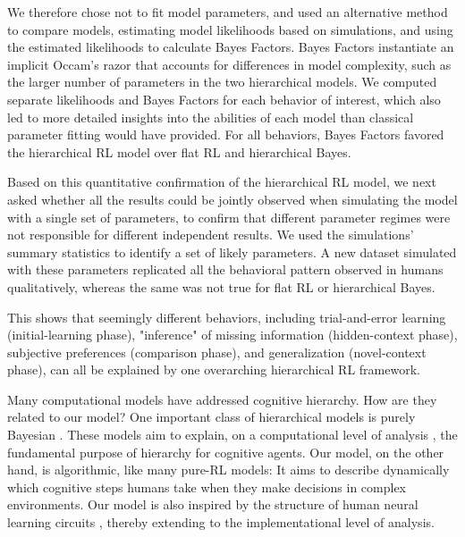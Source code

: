 \documentclass[10pt,letterpaper]{article}  %
\begin{document}
We therefore chose not to fit model parameters, and used an alternative method to compare models, estimating model likelihoods based on simulations, and using the estimated likelihoods to calculate Bayes Factors.
Bayes Factors instantiate an implicit Occam's razor that accounts for differences in model complexity, such as the larger number of parameters in the two hierarchical models. 
We computed separate likelihoods and Bayes Factors for each behavior of interest, which also led to more detailed insights into the abilities of each model than classical parameter fitting would have provided. For all behaviors, Bayes Factors favored the hierarchical RL model over flat RL and hierarchical Bayes.

Based on this quantitative confirmation of the hierarchical RL model, we next asked whether all the results could be jointly observed when simulating the model with a single set of parameters, to confirm that different parameter regimes were not responsible for different independent results. We used the simulations' summary statistics to identify a set of likely parameters.
A new dataset simulated with these parameters replicated all the behavioral pattern observed in humans qualitatively, whereas the same was not true for flat RL or hierarchical Bayes.

This shows that seemingly different behaviors, including trial-and-error learning (initial-learning phase), "inference" of missing information (hidden-context phase), subjective preferences (comparison phase), and generalization (novel-context phase), can all be explained by one overarching hierarchical RL framework.

Many computational models have addressed cognitive hierarchy. How are they related to our model?
One important class of hierarchical models is purely Bayesian \cite{tenenbaum_how_2011, tomov_discovery_2019, solway_optimal_2014}. These models aim to explain, on a computational level of analysis \cite{marr_vision:_1982}, the fundamental purpose of hierarchy for cognitive agents.
Our model, on the other hand, is algorithmic, like many pure-RL models: It aims to describe dynamically which cognitive steps humans take when they make decisions in complex environments. Our model is also inspired by the structure of human neural learning circuits \cite{alexander_parallel_1986, alexander_hierarchical_2015, badre_cognitive_2008}, thereby extending to the implementational level of analysis.
\end{document}
